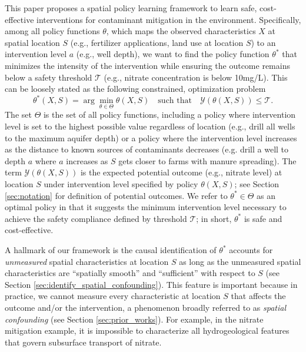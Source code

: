 \documentclass[12pt]{article}
\begin{document}
This paper proposes a spatial policy learning framework to learn safe, cost-effective interventions for contaminant mitigation in the environment. Specifically, among all policy functions $\theta$, which maps the observed characteristics $X$ at spatial location $S$ (e.g., fertilizer applications, land use at location $S$) to an intervention level $a$ (e.g., well depth), we want to find the policy function $\theta^*$ that minimizes the intensity of the intervention while ensuring the outcome remains below a safety threshold $\mathcal{T}$ (e.g., nitrate concentration is below 10mg/L). This can be loosely stated as the following constrained, optimization problem
\begin{equation}\label{eq:brief}
    \theta^*(X,S)=\arg \min_{\theta\in\Theta} \theta(X,S) \quad\text{such that}\quad \mathcal{Y}(\theta(X,S))\leq \mathcal{T}. %
\end{equation}
\noindent The set $\Theta$ is the set of all policy functions, including a policy where intervention level is set to the highest possible value regardless of location (e.g., drill all wells to the maximum aquifer depth) or a policy where the intervention level increases as the distance to known sources of contaminants decreases (e.g. drill a well to depth $a$ where $a$ increases as $S$ gets closer to farms with manure spreading). The term $\mathcal{Y}(\theta(X,S))$ is the expected potential outcome (e.g., nitrate level) at location $S$ under intervention level specified by policy $\theta(X,S)$; see Section \ref{sec:notation} for definition of potential outcomes. We refer to $\theta^* \in \Theta$ as an optimal policy in that it suggests the minimum intervention level necessary to achieve the safety compliance defined by threshold $\mathcal{T}$; in short, $\theta^*$ is safe and cost-effective.



A hallmark of our framework is the causal identification of $\theta^*$ accounts for \emph{unmeasured} spatial characteristics at location $S$ as long as the unmeasured spatial characteristics are ``spatially smooth'' and ``sufficient'' with respect to $S$ (see Section \ref{sec:identify_spatial_confounding}).
This feature is important because in practice, we cannot measure every characteristic at location $S$ that affects the outcome and/or the intervention, a phenomenon broadly referred to as \emph{spatial confounding} (see Section \ref{sec:prior_works}). For example, in the nitrate mitigation example, it is impossible to characterize all hydrogeological features that govern subsurface transport of nitrate.
\end{document}
